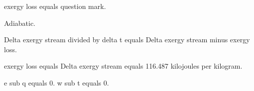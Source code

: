exergy loss equals question mark.  

Adiabatic.  

Delta exergy stream divided by delta t equals Delta exergy stream minus exergy loss.  

exergy loss equals Delta exergy stream equals 116.487 kilojoules per kilogram.  

e sub q equals 0.  
w sub t equals 0.